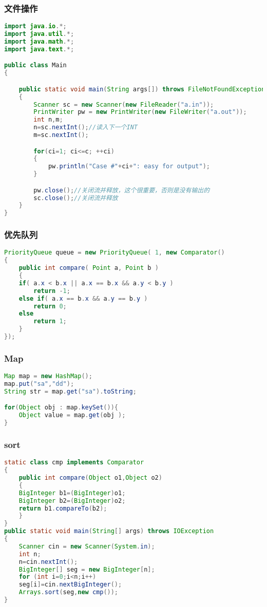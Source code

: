 	\subsubsection{文件操作}
	\begin{lstlisting}[language=java]
import java.io.*;
import java.util.*;
import java.math.*;
import java.text.*;

public class Main
{

	public static void main(String args[]) throws FileNotFoundException, IOException
	{
		Scanner sc = new Scanner(new FileReader("a.in"));
		PrintWriter pw = new PrintWriter(new FileWriter("a.out"));
		int n,m;
		n=sc.nextInt();//读入下一个INT
		m=sc.nextInt();

		for(ci=1; ci<=c; ++ci)
		{
			pw.println("Case #"+ci+": easy for output");
		}

		pw.close();//关闭流并释放，这个很重要，否则是没有输出的
		sc.close();//关闭流并释放
	}
}
	\end{lstlisting}
	
	\subsubsection{优先队列}
	\begin{lstlisting}[language=java]
PriorityQueue queue = new PriorityQueue( 1, new Comparator()
{
	public int compare( Point a, Point b )
	{
	if( a.x < b.x || a.x == b.x && a.y < b.y )
		return -1;
	else if( a.x == b.x && a.y == b.y )
		return 0;
	else
		return 1;
	}
});
	\end{lstlisting}
	
	\subsubsection{Map}
	\begin{lstlisting}[language=java]
Map map = new HashMap();
map.put("sa","dd");
String str = map.get("sa").toString;

for(Object obj : map.keySet()){
	Object value = map.get(obj );
}
	\end{lstlisting}
	
	\subsubsection{sort}
	\begin{lstlisting}[language=java]
static class cmp implements Comparator
{
	public int compare(Object o1,Object o2)
	{
	BigInteger b1=(BigInteger)o1;
	BigInteger b2=(BigInteger)o2;
	return b1.compareTo(b2);
	}
}
public static void main(String[] args) throws IOException
{
	Scanner cin = new Scanner(System.in);
	int n;
	n=cin.nextInt();
	BigInteger[] seg = new BigInteger[n];
	for (int i=0;i<n;i++)
	seg[i]=cin.nextBigInteger();
	Arrays.sort(seg,new cmp());
}
	\end{lstlisting}
